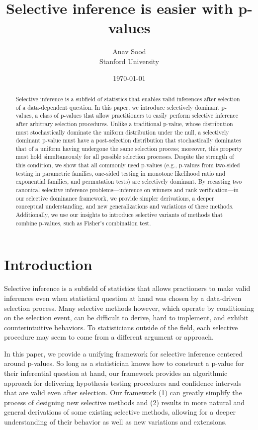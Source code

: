 \documentclass{article}
\title{Selective inference is easier with p-values}
\author{Anav Sood\\ Stanford University}
\date{\today}
\begin{document}
\maketitle

\begin{abstract}
Selective inference is a subfield of statistics that enables valid inferences after selection of a data-dependent question. In this paper, we introduce selectively dominant p-values, a class of p-values that allow practitioners to easily perform selective inference after arbitrary selection procedures. Unlike a traditional p-value, whose distribution must stochastically dominate the uniform distribution under the null, a selectively dominant p-value must have a  post-selection distribution that stochastically dominates that of a uniform having undergone the same selection process; moreover, this property must hold simultaneously for all possible selection processes. Despite the strength of this condition, we show that all commonly used p-values (e.g., p-values from two-sided testing in parametric families, one-sided testing in monotone likelihood ratio and exponential families, and permutation tests) are selectively dominant. By recasting two canonical selective inference problems—inference on winners and rank verification—in our selective dominance framework, we provide simpler derivations, a deeper conceptual understanding, and new generalizations and variations of these methods. Additionally, we use our insights to introduce selective variants of methods that combine p-values, such as Fisher's combination test. 
\end{abstract}


\section{Introduction}

Selective inference is a subfield of statistics that allows practioners to make valid inferences even when statistical question at hand was chosen by a data-driven selection process. Many selective methods however, which operate by conditioning on the selection event, can be difficult to derive, hard to implement, and exhibit counterintuitive behaviors. To statisticians outside of the field, each selective procedure may seem to come from a different argument or approach.

In this paper, we provide a unifying framework for selective inference centered around p-values. So long as a statistician knows how to construct a p-value for their inferential question at hand, our framework provides an algorithmic approach for delivering hypothesis testing procedures and confidence intervals that are valid even after selection. Our framework (1) can greatly simplify the process of designing new selective methods and (2) results in more natural and general derivations of some existing selective methods, allowing for a deeper understanding of their behavior as well as new variations and extensions. 
\end{document}
